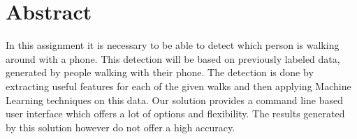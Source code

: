 \section{Abstract}

In this assignment it is necessary to be able to detect which person is walking around with a phone.
This detection will be based on previously labeled data, generated by people walking with their phone.
The detection is done by extracting useful features for each of the given walks and then applying Machine Learning techniques on this data.
Our solution provides a command line based user interface which offers a lot of options and flexibility. The results generated by this solution however do not offer a high accuracy.
